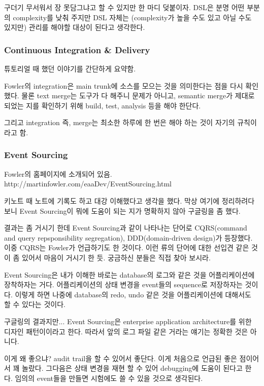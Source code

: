\documentclass[a4paper]{article}
\begin{document}
구더기 무서워서 장 못담그냐고 할 수 있지만 한 마디 덪붙이자. DSL은 분명
어떤 부분의 complexity를 낮춰 주지만 DSL 자체는 (complexity가 높을 수도
있고 아닐 수도 있지만) 관리를 해야할 대상이 된다고 생각한다.
 
\subsubsection{Continuous Integration \& Delivery}
 
튜토리얼 때 했던 이야기를 간단하게 요약함. 
 
Fowler의 integration은 main trunk에 소스를 모으는 것을 의미한다는 점을
다시 확인했다.  물론 text merge는 도구가 다 해주니 문제가 아니고,
semantic merge가 제대로 되었는 지를 확인하기 위해 build, test,
analysis 등을 해야 한단다.
 
그리고 integration 즉, merge는 최소한 하루에 한 번은 해야 하는 것이
자기의 규칙이라고 함.
 
\subsubsection{Event Sourcing}
 
Fowler의 홈페이지에 소개되어 있음.
http://martinfowler.com/eaaDev/EventSourcing.html
 
키노트 때 노트에 기록도 하고 대강 이해했다고 생각을 했다. 막상 여기에
정리하려다 보니 Event Sourcing이 뭐에 도움이 되는 지가 명확하지 않아
구글링을 좀 했다.
 
결과는 좀 거시기 한데 Event Sourcing과 같이 나타나는 단어로
CQRS(command and query repsponsibility segregation), DDD(domain-driven
design)가 등장했다. 이중 CQRS는 Fowler가 언급하기도 한 것이다. 이런
류의 단어에 대한 선입견 같은 것이 좀 있어서 마음이 거시기 한
듯. 궁금하신 분들은 직접 찾아 보시라.
 
Event Sourcing은 내가 이해한 바로는 database의 로그와 같은 것을
어플리케이션에 장착하자는 거다. 어플리케이션의 상태 변경을 event들의
sequence로 저장하자는 것이다. 이렇게 하면 나중에 database의 redo, undo
같은 것을 어플리케이션에 대해서도 할 수 있다는 것이다.
 
구글링의 결과지만... Event Sourcing은 enterprise application
architecture를 위한 디자인 패턴이이라고 한다. 따라서 앞의 로그 파일
같은 거라는 얘기는 정확한 것은 아니다.
 
이게 왜 좋으냐? audit trail을 할 수 있어서 좋단다. 이게 처음으로 언급된
좋은 점이어서 꽤 놀랐다. 그다음은 상태 변경을 재현 할 수 있어
debugging에 도움이 된다고 한다.  임의의 event들을 만들면 시험에도 쓸 수
있을 것으로 생각된다.
\end{document}
